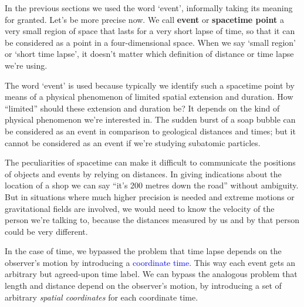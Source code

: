\documentclass[a4paper,12pt,%
onecolumn,oneside,%
british%
]{memoir}
\renewcommand*{\|}[1][]{\nonscript\:#1\vert\nonscript\:\mathopen{}}
\newcommand*{\sect}{\S}%
\renewcommand*{\autoref}[2]{\sidepar{\vspace{-1ex}\footnotesize{\color{blue}\faIcon{%
angle-right%
}\enskip\sect~\ref{#1} page~\pageref{#1}}}\textcolor{blue}{#2}}
\begin{document}
In the previous sections we used the word \enquote*{event}, informally taking its meaning for granted. Let's be more precise now. We call \textbf{event} or \textbf{spacetime point} a very small region of space that lasts for a very short lapse of time, so  that it can be considered as a point in a four-dimensional space. When we say \enquote*{small region} or \enquote*{short time lapse}, it doesn't matter which definition of distance or time lapse we're using.

The word \enquote*{event} is used because typically we identify such a spacetime point by means of a physical phenomenon of limited spatial extension and duration. How \enquote{limited} should these extension and duration be? It depends on the kind of physical phenomenon we're interested in. The sudden burst of a soap bubble can be considered as an event in comparison to geological distances and times; but it cannot be considered as an event if we're studying subatomic particles.


\medskip

The peculiarities of spacetime can make it difficult to communicate the positions of objects and events by relying on distances. In giving indications about the location of a shop we can say \enquote{it's 200 metres down the road} without ambiguity. But in situations where much higher precision is needed and extreme motions or gravitational fields are involved, we would need to know the velocity of the person we're talking to, because the distances measured by us and by that person could be very different. %


In the case of time, we bypassed the problem that time lapse depends on the observer's motion by introducing a \autoref{sec:coord_time}{coordinate time}. This way each event gets an arbitrary but agreed-upon time label. We can bypass the analogous problem that length and distance depend on the observer's motion, by introducing a set of arbitrary \emph{spatial coordinates} for each coordinate time.
\end{document}
